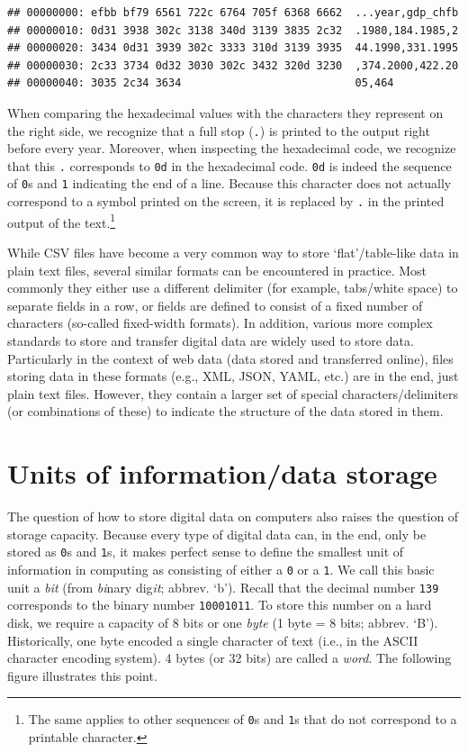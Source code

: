 \documentclass[
  12pt,
]{style/krantz}
\begin{document}
\begin{verbatim}
## 00000000: efbb bf79 6561 722c 6764 705f 6368 6662  ...year,gdp_chfb
## 00000010: 0d31 3938 302c 3138 340d 3139 3835 2c32  .1980,184.1985,2
## 00000020: 3434 0d31 3939 302c 3333 310d 3139 3935  44.1990,331.1995
## 00000030: 2c33 3734 0d32 3030 302c 3432 320d 3230  ,374.2000,422.20
## 00000040: 3035 2c34 3634                           05,464
\end{verbatim}

When comparing the hexadecimal values with the characters they represent on the right side, we recognize that a full stop (\texttt{.}) is printed to the output right before every year. Moreover, when inspecting the hexadecimal code, we recognize that this \texttt{.} corresponds to \texttt{0d} in the hexadecimal code. \texttt{0d} is indeed the sequence of \texttt{0}s and \texttt{1} indicating the end of a line. Because this character does not actually correspond to a symbol printed on the screen, it is replaced by \texttt{.} in the printed output of the text.\footnote{The same applies to other sequences of \texttt{0}s and \texttt{1}s that do not correspond to a printable character.}

While CSV files have become a very common way to store `flat'/table-like data in plain text files, several similar formats can be encountered in practice. Most commonly they either use a different delimiter (for example, tabs/white space) to separate fields in a row, or fields are defined to consist of a fixed number of characters (so-called fixed-width formats). In addition, various more complex standards to store and transfer digital data are widely used to store data. Particularly in the context of web data (data stored and transferred online), files storing data in these formats (e.g., XML, JSON, YAML, etc.) are in the end, just plain text files. However, they contain a larger set of special characters/delimiters (or combinations of these) to indicate the structure of the data stored in them.

\hypertarget{units-of-informationdata-storage}{%
\section{Units of information/data storage}\label{units-of-informationdata-storage}}

The question of how to store digital data on computers also raises the question of storage capacity. Because every type of digital data can, in the end, only be stored as \texttt{0}s and \texttt{1}s, it makes perfect sense to define the smallest unit of information in computing as consisting of either a \texttt{0} or a \texttt{1}. We call this basic unit a \emph{bit} (from \emph{bi}nary dig\emph{it}; abbrev. `b'). Recall that the decimal number \texttt{139} corresponds to the binary number \texttt{10001011}. To store this number on a hard disk, we require a capacity of 8 bits or one \emph{byte} (1 byte = 8 bits; abbrev. `B'). Historically, one byte encoded a single character of text (i.e., in the ASCII character encoding system). 4 bytes (or 32 bits) are called a \emph{word}. The following figure illustrates this point.
\end{document}
